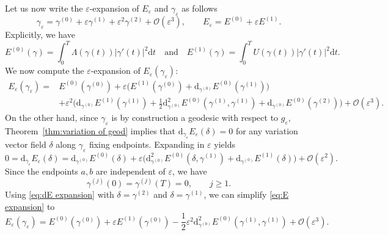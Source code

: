 \documentclass[11pt,letterpaper,oneside]{amsart}
\renewcommand{\epsilon}{\varepsilon}
\theoremstyle{definition}
\theoremstyle{remark}
\theoremstyle{definition}
\theoremstyle{remark}
\newcommand{\CO}{\mathcal{O}}
\newcommand{\dif}{\mathrm{d}}
\begin{document}
Let us now write the $\epsilon$-expansion of $E_\epsilon$ and $\gamma_\epsilon$ as follows 
\begin{equation*}    \gamma_\epsilon = \gamma^{(0)} + \epsilon \gamma^{(1)} + \epsilon^2 \gamma^{(2)} + \CO(\epsilon^3), \qquad E_\epsilon = E^{(0)} + \epsilon E^{(1)}.
\end{equation*}
Explicitly, we have 
\begin{equation}\label{eq:E explicit}
    E^{(0)}(\gamma) = \int_0^T \Lambda(\gamma(t)) |\gamma'(t)|^2 \dif t \quad \text{and} \quad  
    E^{(1)}(\gamma) = \int_0^T U(\gamma(t)) |\gamma'(t)|^2 \dif t.
\end{equation}
We now compute the $\epsilon$-expansion of $E_\epsilon(\gamma_\epsilon)$:
\begin{equation}\label{eq:E expansion}
    \begin{aligned}
    E_\epsilon(\gamma_\epsilon) =& E^{(0)}(\gamma^{(0)}) + \epsilon \Big(E^{(1)}(\gamma^{(0)}) + \dif_{\gamma^{(0)}}E^{(0)}(\gamma^{(1)}) \Big) \\
    &+ \epsilon^2 \Big(\dif_{\gamma^{(0)}}E^{(1)}(\gamma^{(1)}) + \frac{1}{2}\dif^2_{\gamma^{(0)}}E^{(0)}(\gamma^{(1)},\gamma^{(1)}) + \dif_{\gamma^{(0)}}E^{(0)}(\gamma^{(2)} )\Big) + \CO(\epsilon^3).
    \end{aligned}
\end{equation}
On the other hand, since $\gamma_\epsilon$ is by construction a geodesic with respect to $g_\epsilon$, Theorem~\ref{thm:variation of geod} implies that $\dif_{\gamma_\epsilon}E_\epsilon(\delta) = 0$ for any variation vector field $\delta$ along $\gamma_\epsilon$ fixing endpoints. Expanding in $\epsilon$ yields
\begin{equation}\label{eq:dE expansion}
    0 = \dif_{\gamma_\epsilon}E_\epsilon(\delta) = \dif_{\gamma^{(0)}}E^{(0)}(\delta) + \epsilon \Big( \dif^2_{\gamma^{(0)}} E^{(0)}(\delta, \gamma^{(1)}) + \dif_{\gamma^{(0)}}E^{(1)}(\delta) \Big) + \CO(\epsilon^2).
\end{equation}
Since the endpoints \(a,b\) are independent of \(\epsilon\), we have
\[
\gamma^{(j)}(0)=\gamma^{(j)}(T)=0,\qquad j\ge1.
\]
Using \eqref{eq:dE expansion} with $\delta = \gamma^{(2)}$ and $\delta = \gamma^{(1)}$, we can simplify \eqref{eq:E expansion} to
\begin{equation}\label{eq:E reduced}
    E_\epsilon(\gamma_\epsilon) = E^{(0)}(\gamma^{(0)}) + \epsilon E^{(1)}(\gamma^{(0)})  - \frac{1}{2} \epsilon^2 \dif^2_{\gamma^{(0)}}E^{(0)}(\gamma^{(1)},\gamma^{(1)}) + \CO(\epsilon^3).
\end{equation}
\end{document}
